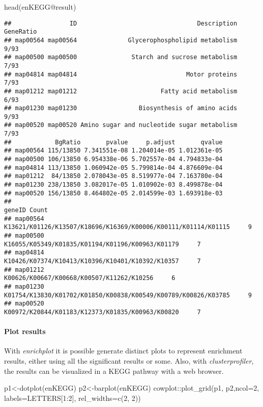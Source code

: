\documentclass[
]{article}
\newenvironment{Shaded}{\begin{snugshade}}{\end{snugshade}}
\newcommand{\AttributeTok}[1]{\textcolor[rgb]{0.77,0.63,0.00}{#1}}
\newcommand{\DecValTok}[1]{\textcolor[rgb]{0.00,0.00,0.81}{#1}}
\newcommand{\FunctionTok}[1]{\textcolor[rgb]{0.00,0.00,0.00}{#1}}
\newcommand{\NormalTok}[1]{#1}
\newcommand{\OtherTok}[1]{\textcolor[rgb]{0.56,0.35,0.01}{#1}}
\newcommand{\SpecialCharTok}[1]{\textcolor[rgb]{0.00,0.00,0.00}{#1}}
\begin{document}
\begin{Shaded}
\begin{Highlighting}[]
\FunctionTok{head}\NormalTok{(enKEGG}\SpecialCharTok{@}\NormalTok{result)}
\end{Highlighting}
\end{Shaded}

\begin{verbatim}
##                ID                                 Description GeneRatio
## map00564 map00564              Glycerophospholipid metabolism      9/93
## map00500 map00500               Starch and sucrose metabolism      7/93
## map04814 map04814                              Motor proteins      7/93
## map01212 map01212                       Fatty acid metabolism      6/93
## map01230 map01230                 Biosynthesis of amino acids      9/93
## map00520 map00520 Amino sugar and nucleotide sugar metabolism      7/93
##            BgRatio       pvalue     p.adjust       qvalue
## map00564 115/13850 7.341551e-08 1.204014e-05 1.012361e-05
## map00500 106/13850 6.954338e-06 5.702557e-04 4.794833e-04
## map04814 113/13850 1.060942e-05 5.799814e-04 4.876609e-04
## map01212  84/13850 2.078043e-05 8.519977e-04 7.163780e-04
## map01230 238/13850 3.082017e-05 1.010902e-03 8.499878e-04
## map00520 156/13850 8.464802e-05 2.014599e-03 1.693918e-03
##                                                                  geneID Count
## map00564 K13621/K01126/K13507/K18696/K16369/K00006/K00111/K01114/K01115     9
## map00500               K16055/K05349/K01835/K01194/K01196/K00963/K01179     7
## map04814               K10426/K07374/K10413/K10396/K10401/K10392/K10357     7
## map01212                      K00626/K00667/K00668/K00507/K11262/K10256     6
## map01230 K01754/K13830/K01702/K01850/K00838/K00549/K00789/K00826/K03785     9
## map00520               K00972/K20844/K01183/K12373/K01835/K00963/K00820     7
\end{verbatim}

\hypertarget{plot-results}{%
\paragraph{Plot results}\label{plot-results}}

With \emph{enrichplot} it is possible generate distinct plots to
represent enrichment results, either using all the significant results
or some. Also, with \emph{clusterprofiler}, the results can be
visualized in a KEGG pathway with a web browser.

\begin{Shaded}
\begin{Highlighting}[]
\NormalTok{p1}\OtherTok{\textless{}{-}}\FunctionTok{dotplot}\NormalTok{(enKEGG)}
\NormalTok{p2}\OtherTok{\textless{}{-}}\FunctionTok{barplot}\NormalTok{(enKEGG)}
\NormalTok{cowplot}\SpecialCharTok{::}\FunctionTok{plot\_grid}\NormalTok{(p1, p2,}\AttributeTok{ncol=}\DecValTok{2}\NormalTok{, }\AttributeTok{labels=}\NormalTok{LETTERS[}\DecValTok{1}\SpecialCharTok{:}\DecValTok{2}\NormalTok{], }\AttributeTok{rel\_widths=}\FunctionTok{c}\NormalTok{(}\DecValTok{2}\NormalTok{, }\DecValTok{2}\NormalTok{))}
\end{Highlighting}
\end{Shaded}
\end{document}
